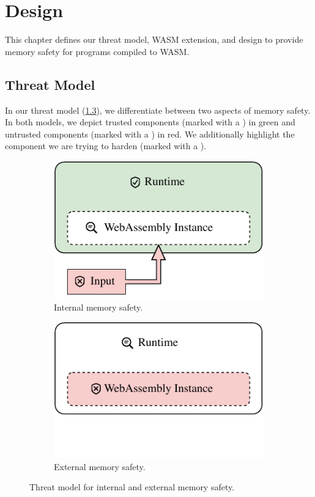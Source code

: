 \chapter{Design}
\label{ch:design}

This chapter defines our threat model, \ac{WASM} extension, and design to provide memory safety for programs compiled to \ac{WASM}.


\section{Threat Model}
\label{sec:threat-model}

In our threat model (\cref{fig:threat-model}), we differentiate between two aspects of memory safety.
In both models, we depict trusted components (marked with a ) in green and untrusted components (marked with a ) in red.
We additionally highlight the component we are trying to harden (marked with a ).

\begin{figure}
    \centering
    \begin{subfigure}[T]{0.45\textwidth}
        \centering
        \includegraphics{figures/build/wasm-internal-mem-safety}
        \caption{Internal memory safety.}
        \label{fig:internal-mem-safety}
    \end{subfigure}
    \hfill
    \begin{subfigure}[T]{0.45\textwidth}
        \centering
        \includegraphics{figures/build/wasm-external-mem-safety}
        \hspace{\fill}
        \caption{External memory safety.}
        \label{fig:external-mem-safety}
    \end{subfigure}
    \caption{Threat model for internal and external memory safety.}
    \label{fig:threat-model}
\end{figure}

